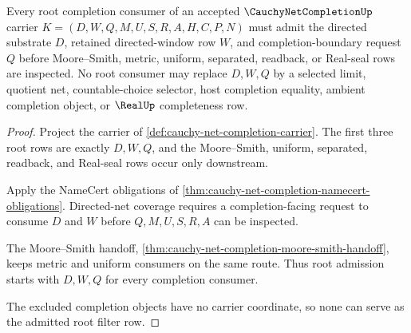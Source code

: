 \begin{theorem}
\label{thm:cauchy-net-completion-root-filter-admission}
Every root completion consumer of an accepted $\CauchyNetCompletionUp$ carrier $K=(D,W,Q,M,U,S,R,A,H,C,P,N)$ must admit the directed substrate $D$, retained directed-window row $W$, and completion-boundary request $Q$ before Moore--Smith, metric, uniform, separated, readback, or Real-seal rows are inspected. No root consumer may replace $D,W,Q$ by a selected limit, quotient net, countable-choice selector, host completion equality, ambient completion object, or $\RealUp$ completeness row.
\end{theorem}
\begin{proof}
Project the carrier of \autoref{def:cauchy-net-completion-carrier}. The first three root rows are exactly $D,W,Q$, and the Moore--Smith, uniform, separated, readback, and Real-seal rows occur only downstream.

Apply the NameCert obligations of \autoref{thm:cauchy-net-completion-namecert-obligations}. Directed-net coverage requires a completion-facing request to consume $D$ and $W$ before $Q,M,U,S,R,A$ can be inspected.

The Moore--Smith handoff, \autoref{thm:cauchy-net-completion-moore-smith-handoff}, keeps metric and uniform consumers on the same route. Thus root admission starts with $D,W,Q$ for every completion consumer.

The excluded completion objects have no carrier coordinate, so none can serve as the admitted root filter row.
\end{proof}

